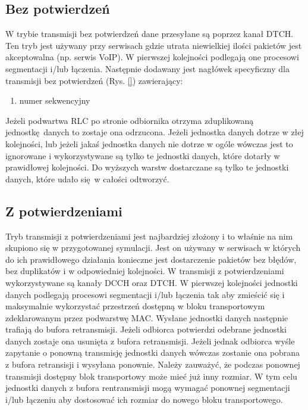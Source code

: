 \subsection{Bez potwierdzeń}
\label{subsec:um}

W trybie transmisji bez potwierdzeń dane przesyłane są poprzez kanał DTCH. Ten tryb jest używany przy serwisach gdzie utrata niewielkiej ilości pakietów jest akceptowalna (np. serwis VoIP). W pierwszej kolejności podlegają one procesowi segmentacji i/lub łączenia. Następnie dodawany jest nagłówek specyficzny dla transmisji bez potwierdzeń (Rys. \ref{}) zawierający: 
\begin{enumerate}
	\item numer sekwencyjny
\end{enumerate}
 Jeżeli podwartwa RLC po stronie odbiornika otrzyma zduplikowaną jednostkę danych to zostaje ona odrzucona. Jeżeli jednostka danych dotrze w złej kolejności, lub jeżeli jakaś jednostka danych nie dotrze w ogóle wówczas jest to ignorowane i wykorzystywane są tylko te jednostki danych, które dotarły w prawidłowej kolejności. Do wyższych warstw dostarczane są tylko te jednostki danych, które udało się w całości odtworzyć. 

\subsection{Z potwierdzeniami}
\label{subsec:am}

Tryb transmisji z potwierdzeniami jest najbardziej złożony i to właśnie na nim skupiono się w przygotowanej symulacji. Jest on używany w serwisach w których do ich prawidłowego działania konieczne jest dostarczenie pakietów bez błędów, bez duplikatów i w odpowiedniej kolejności. W transmisji z potwierdzeniami wykorzystywane są kanały DCCH oraz DTCH. W pierwszej kolejności jednostki danych podlegają procesowi segmentacji i/lub łączenia tak aby zmieścić się i maksymalnie wykorzystać przestrzeń dostępną w bloku transportowym zdeklarowanym przez podwarstwę MAC. Wysłane jednostki danych następnie trafiają do bufora retransmisji. Jeżeli odbiorca potwierdzi odebrane jednostki danych zostaje ona usunięta z bufora retransmisji. Jeżeli jednak odbiorca wyśle zapytanie o ponowną transmisję jednostki danych wówczas zostanie ona pobrana z bufora retransisji i wysyłana ponownie. Należy zauważyć, że podczas ponownej transmisji dostępny blok transportowy może mieć już inny rozmiar. W tym celu jednostki danych z bufora rentransmisji mogą wymagać ponownej segmentacji i/lub łączeniu aby dostosować ich rozmiar do nowego bloku transportowego.

